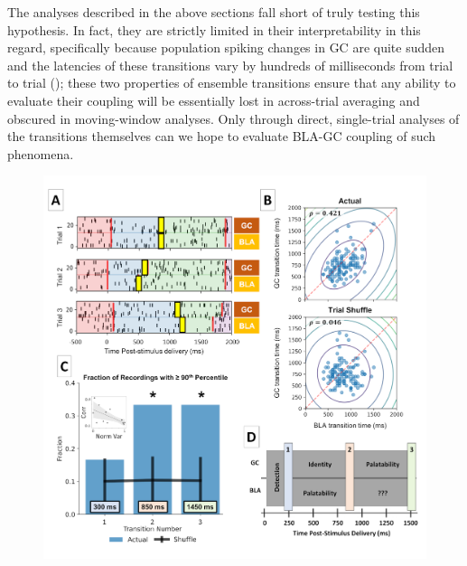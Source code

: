\begin{refsection}
The analyses described in the above sections fall short of truly testing this hypothesis. In fact, they are strictly limited in their interpretability in this regard, specifically because population spiking changes in GC are quite sudden and the latencies of these transitions vary by hundreds of milliseconds from trial to trial (\cite{jones2006a,sadacca2016a}); these two properties of ensemble transitions ensure that any ability to evaluate their coupling will be essentially lost in across-trial averaging and obscured in moving-window analyses. Only through direct, single-trial analyses of the transitions themselves can we hope to evaluate BLA-GC coupling of such phenomena. 

\begin{figure}
\centering
\includegraphics[width=0.9\linewidth]{mahmood_22_figures/fig9-0.png}

\end{figure}
\end{refsection}
